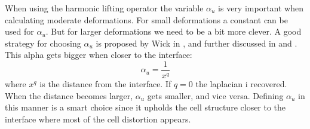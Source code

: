 When using the harmonic lifting operator the variable $\alpha_u$ is very important when calculating moderate deformations. For small deformations a constant can be used for $\alpha_u$. But for larger deformations we need to be a bit more clever. A good strategy for choosing $\alpha_u$ is proposed by Wick in \cite{Wick2011a}, and further discussed in \cite{Stein2003} and \cite{MM2016}. This alpha gets bigger when closer to the interface: 
\begin{equation}
\alpha_u = \frac{1}{x^q}
\end{equation}
where $x^q$ is the distance from the interface. If $q=0$ the laplacian i recovered. When the distance becomes larger, $\alpha_u$ gets smaller, and vice versa. 
Defining $\alpha_u$ in this manner is a smart choice since it upholds the cell structure closer to the interface where most of the cell distortion appears. 

